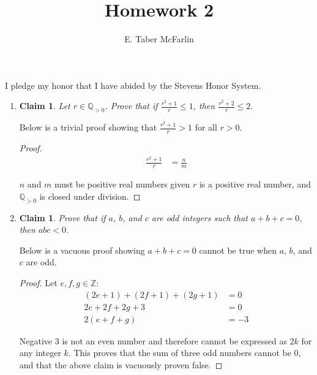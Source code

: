 \documentclass[12pt,a4paper,reqno,parskip=full]{amsart}
\numberwithin{equation}{section}
\theoremstyle{plain}
\newtheorem{claim}[subsection]{Claim}
\theoremstyle{definition}
\renewcommand{\leq}{\leqslant}
\begin{document}
\title{Homework 2}

\author{E. Taber McFarlin}

\maketitle

I pledge my honor that I have abided by the Stevens Honor System.

\begin{enumerate}
  \item{
        \begin{claim}
          Let $r\in\mathbb{Q}_{>0}$. Prove that if $\frac{r^2+1}{r}\leq1$, then $\frac{r^2+2}{r}\leq2$.
        \end{claim}

        Below is a trivial proof showing that $\frac{r^2+1}{r}>1$ for all $r > 0$.
        \begin{proof}

          \begin{align*}
            \frac{r^2 + 1}{r} & = \frac{n}{m}
          \end{align*}

          $n$ and $m$ must be positive real numbers given $r$ is a positive real number, and $\mathbb{Q}_{>0}$ is closed under division.
        \end{proof}}

  \item {
        \begin{claim}
          Prove that if $a$, $b$, and $c$ are odd integers such that $a+b+c=0$, then $abc<0$.
        \end{claim}

        Below is a vacuous proof showing $a+b+c=0$ cannot be true when $a$, $b$, and $c$ are odd.
        \begin{proof}
          Let $e, f, g \in \mathbb{Z}$:
          \begin{align*}
            (2e + 1) + (2f + 1) + (2g + 1) & = 0  \\
            2e + 2f + 2g + 3               & = 0  \\
            2(e + f + g)                   & = -3
          \end{align*}

          Negative 3 is not an even number and therefore cannot be expressed as $2k$ for any integer $k$. This proves that the sum of three odd numbers cannot be 0, and that the above claim is vacuously proven false.
        \end{proof}}


\end{enumerate}
\end{document}
